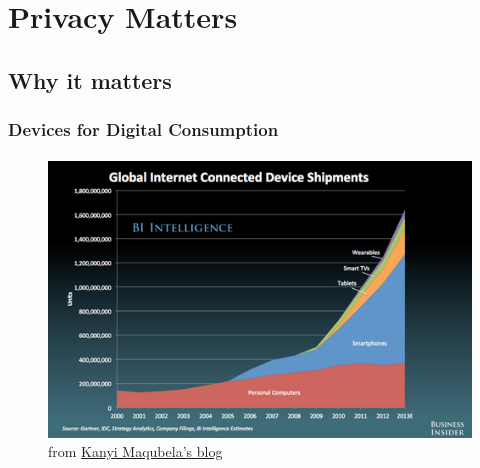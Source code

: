 % 
\section{Privacy Matters}
\subsection{Why it matters}
	\begin{frame}
	\frametitle{Devices for Digital Consumption}
	\framesubtitle{}
	        \begin{figure}[h]
                \centering
                \includegraphics[width=.8\textwidth]{../pics/globalIOTDeviceShipments}
		\caption{from \href{http://blog.kanyi.me/post/66994307568/contrarian-thinking-mobile-vs-pc-in-emerging}{Kanyi Maqubela's blog}}
        	\end{figure}
	\end{frame}


